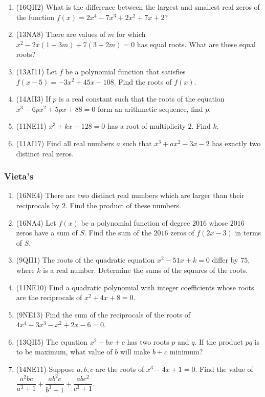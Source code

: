 \documentclass[10pt,paper=letter]{scrartcl}
\begin{document}
\begin{enumerate}

\item (16QII2) What is the difference between the largest and smallest real zeros of the function $f(x) = 2x^4 - 7x^3 + 2x^2 + 7x + 2$?

\item (13NA8) There are values of $m$ for which $x^2 - 2x(1+3m) + 7(3+2m) = 0$ has equal roots. What are these equal roots?

\item (13AI11) Let $f$ be a polynomial function that satisfies $f(x-5) = -3x^2 + 45x - 108$. Find the roots of $f(x)$.

\item (14AII3) If $p$ is a real constant such that the roots of the equation $x^3 - 6px^2 + 5px + 88 = 0$ form an arithmetic sequence, find $p$.

\item (11NE11) $x^3 + kx - 128 = 0$ has a root of multiplicity $2$. Find $k$.

\item (11AI17) Find all real numbers $a$ such that $x^3 + ax^2 - 3x - 2$ has exactly two distinct real zeros.

\end{enumerate}

\subsubsection*{Vieta's}

\begin{enumerate}

\item (16NE4) There are two distinct real numbers which are larger than their reciprocals by $2$. Find the product of these numbers. 

\item (16NA4) Let $f(x)$ be a polynomial function of degree $2016$ whose $2016$ zeros have a sum of $S$. Find the sum of the $2016$ zeros of $f(2x-3)$ in terms of $S$.

\item (9QII1) The roots of the quadratic equation $x^2 - 51x + k = 0$ differ by $75$, where $k$ is a real number. Determine the sums of the squares of the roots.

\item (11NE10) Find a quadratic polynomial with integer coefficients whose roots are the reciprocals of $x^2 + 4x + 8 = 0$.

\item (9NE13) Find the sum of the reciprocals of the roots of $4x^4 - 3x^3 - x^2 + 2x - 6 = 0$.

\item (13QII5) The equation $x^2 - bx + c$ has two roots $p$ and $q$. If the product $pq$ is to be maximum, what value of $b$ will make $b+c$ minimum?

\item (14NE11) Suppose $a, b, c$ are the roots of $x^3 - 4x + 1 = 0$. Find the value of $\dfrac{a^2bc}{a^3+1} + \dfrac{ab^2c}{b^3+1} + \dfrac{abc^2}{c^3+1}.$

\end{enumerate}
\end{document}
